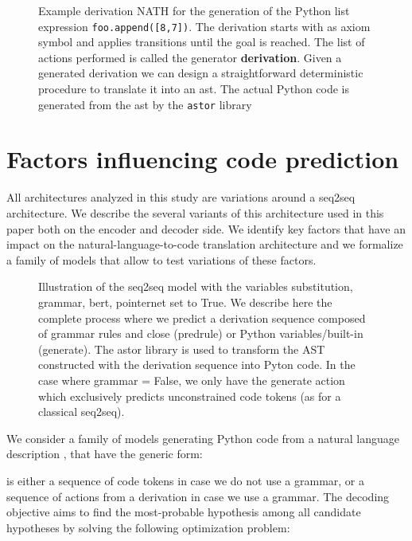 \documentclass[11pt]{article}
\newcommand{\var}{\sc}
\begin{document}
{\begin{figure*}
\begin{center}
\end{center}
\caption{\label{fig:exampleNath}Example derivation NATH for the generation of the Python list expression {\tt foo.append([8,7])}. The derivation starts with  as axiom symbol and applies transitions until the goal is reached. The list of actions performed is called the generator {\bf derivation}. Given a generated derivation we can design a straightforward deterministic procedure to translate it into an {\sc ast}. The actual Python code is generated from the {\sc ast} by the {\tt astor} library}
\end{figure*}
}

\section{Factors influencing code prediction}
\label{Code Generation}

All architectures analyzed in this study are variations around a seq2seq architecture. We describe the several variants of this architecture used in this paper both on the encoder and decoder side.
We identify key factors that have an impact on the natural-language-to-code translation architecture and we formalize a family of models that allow to test variations of these factors.

\begin{figure*}
\begin{center}
\end{center}
\caption{\label{fig:model}Illustration of the seq2seq model with the variables {\var substitution}, {\var grammar}, {\var bert}, {\var pointernet} set to {\var True}. We describe here the complete process where we predict a derivation sequence composed of grammar rules and {\sc close} ({\sc predrule}) or Python variables/built-in ({\sc generate}). The astor library is used to transform the AST constructed with the derivation sequence into Pyton code. In the case where {\var grammar = False}, we only have the {\sc generate} action which exclusively predicts unconstrained code tokens (as for a classical seq2seq).}
\end{figure*}

We consider a family of models generating Python code  from a natural language description , that have the generic form: 

 is either a sequence of code tokens in case we do not use a grammar, or a sequence of actions from a derivation in case we use a grammar.
The decoding objective aims to find the most-probable hypothesis among all candidate hypotheses by solving the following optimization problem:
\end{document}
